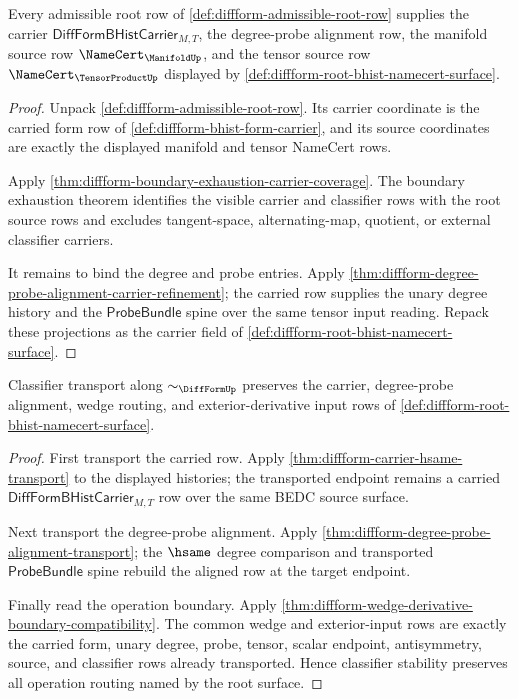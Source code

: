 \begin{theorem}
\label{thm:diffform-root-bhist-carrier-obligation}
Every admissible root row of \autoref{def:diffform-admissible-root-row}
supplies the carrier $\mathsf{DiffFormBHistCarrier}_{M,T}$, the
degree-probe alignment row, the manifold source row
$\NameCert_{\ManifoldUp}$, and the tensor source row
$\NameCert_{\TensorProductUp}$ displayed by
\autoref{def:diffform-root-bhist-namecert-surface}.
\end{theorem}
\begin{proof}
Unpack \autoref{def:diffform-admissible-root-row}. Its carrier coordinate is
the carried form row of \autoref{def:diffform-bhist-form-carrier}, and its
source coordinates are exactly the displayed manifold and tensor NameCert
rows.

Apply
\autoref{thm:diffform-boundary-exhaustion-carrier-coverage}. The boundary
exhaustion theorem identifies the visible carrier and classifier rows with
the root source rows and excludes tangent-space, alternating-map, quotient, or
external classifier carriers.

It remains to bind the degree and probe entries. Apply
\autoref{thm:diffform-degree-probe-alignment-carrier-refinement}; the carried
row supplies the unary degree history and the $\mathsf{ProbeBundle}$ spine
over the same tensor input reading. Repack these projections as the carrier
field of \autoref{def:diffform-root-bhist-namecert-surface}.
\end{proof}

\begin{theorem}
\label{thm:diffform-root-bhist-classifier-stability-obligation}
Classifier transport along $\sim_{\DiffFormUp}$ preserves the carrier,
degree-probe alignment, wedge routing, and exterior-derivative input rows of
\autoref{def:diffform-root-bhist-namecert-surface}.
\end{theorem}
\begin{proof}
First transport the carried row. Apply
\autoref{thm:diffform-carrier-hsame-transport} to the displayed histories;
the transported endpoint remains a carried
$\mathsf{DiffFormBHistCarrier}_{M,T}$ row over the same BEDC source surface.

Next transport the degree-probe alignment. Apply
\autoref{thm:diffform-degree-probe-alignment-transport}; the $\hsame$ degree
comparison and transported $\mathsf{ProbeBundle}$ spine rebuild the aligned
row at the target endpoint.

Finally read the operation boundary. Apply
\autoref{thm:diffform-wedge-derivative-boundary-compatibility}. The common
wedge and exterior-input rows are exactly the carried form, unary degree,
probe, tensor, scalar endpoint, antisymmetry, source, and classifier rows
already transported. Hence classifier stability preserves all operation
routing named by the root surface.
\end{proof}

